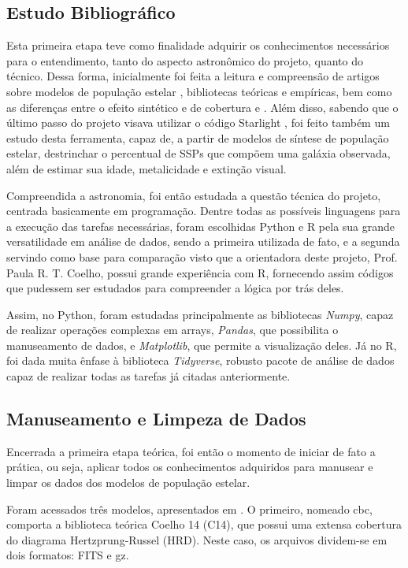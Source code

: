 \documentclass[12pt]{projeto}
\begin{document}
\subsection{Estudo Bibliográfico}
Esta primeira etapa teve como finalidade adquirir os conhecimentos necessários para o entendimento, tanto do aspecto astronômico do projeto, quanto do técnico. Dessa forma, inicialmente foi feita a leitura e compreensão de artigos sobre modelos de população estelar \cite{BC03}, bibliotecas teóricas e empíricas, bem como as diferenças entre o efeito sintético e de cobertura \cite{Paula2014} e \cite{Paula2020}. Além disso, sabendo que o último passo do projeto visava utilizar o código Starlight \cite{starlight}, foi feito também um estudo desta ferramenta,
capaz de, a partir de modelos de síntese de população estelar, destrinchar o percentual de SSPs que compõem uma galáxia observada, além de estimar sua idade, metalicidade e extinção visual.

Compreendida a astronomia, foi então estudada a questão técnica do projeto, centrada basicamente em programação. Dentre todas as possíveis linguagens para a execução das tarefas necessárias, foram escolhidas Python e R pela sua grande versatilidade em análise de dados, sendo a primeira utilizada de fato, e a segunda servindo como base para comparação visto que a orientadora deste projeto, Prof. Paula R. T. Coelho, possui grande experiência com R, fornecendo assim códigos que pudessem ser estudados para compreender a lógica por trás deles.

Assim, no Python, foram estudadas principalmente as bibliotecas \textit{Numpy}, capaz de realizar operações complexas em arrays, \textit{Pandas}, que possibilita o manuseamento de dados, e \textit{Matplotlib}, que permite a visualização deles. Já no R, foi dada muita ênfase à biblioteca \textit{Tidyverse}, robusto pacote de análise de dados capaz de realizar todas as tarefas já citadas anteriormente.

\subsection{Manuseamento e Limpeza de Dados}

Encerrada a primeira etapa teórica, foi então o momento de iniciar de fato a prática, ou seja, aplicar todos os conhecimentos adquiridos para manusear e limpar os dados dos modelos de população estelar.

Foram acessados três modelos, apresentados em \cite{Paula2020}. O primeiro, nomeado cbc, comporta a biblioteca teórica Coelho 14 (C14), que possui uma extensa cobertura do diagrama Hertzprung-Russel (HRD). Neste caso, os arquivos dividem-se em dois formatos: FITS e gz. 
\end{document}
